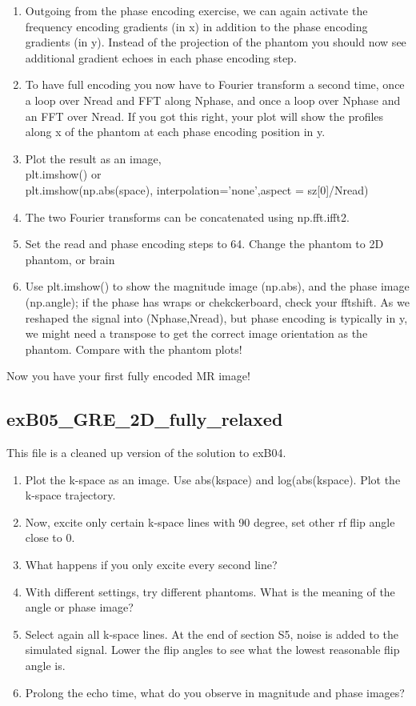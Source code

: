 \documentclass[a4paper,12pt]{extarticle}
\begin{document}
\begin{enumerate}
\item  Outgoing from the phase encoding exercise, we can again activate the frequency encoding gradients (in x) in addition to the phase encoding gradients (in y). Instead of the projection of the phantom you should now see additional gradient echoes in each phase encoding step.
\item To have full encoding you now have to Fourier transform a second time, once a loop over Nread and FFT along Nphase, and once a loop over Nphase  and an FFT over Nread. If you got this right, your plot will show the profiles along x of the phantom at each phase encoding position in y.
\item Plot the result as an image, \\plt.imshow()  or \\ plt.imshow(np.abs(space), interpolation='none',aspect = sz[0]/Nread)

\item The two Fourier transforms can be concatenated using np.fft.ifft2. 
\item Set the read and phase encoding steps to 64. Change the phantom to 2D phantom, or brain 
\item Use plt.imshow() to show the magnitude image (np.abs), and the phase image (np.angle); if the phase has wraps or chekckerboard, check your fftshift. As we reshaped the signal into (Nphase,Nread), but phase encoding is typically in y, we might need a transpose to get the correct image orientation as the phantom. Compare with the phantom plots!
\end{enumerate}
Now you have your first fully encoded MR image!


\subsection{exB05\_GRE\_2D\_fully\_relaxed}
This file is a cleaned up version of the solution to exB04.
\begin{enumerate}
\item Plot the k-space as an image. Use abs(kspace) and log(abs(kspace). Plot the k-space trajectory.
\item Now, excite only certain k-space lines with 90 degree, set other rf flip angle close to 0.
\item What happens if you only excite every second line?

\item With different settings, try different phantoms. What is the meaning of the angle or phase image?
\item Select again all k-space lines. At the end of section S5, noise is added to the simulated signal. Lower the flip angles to see what the lowest reasonable flip angle is. 
\item Prolong the echo time, what do you observe in magnitude and phase images?
\end{enumerate}
\end{document}
